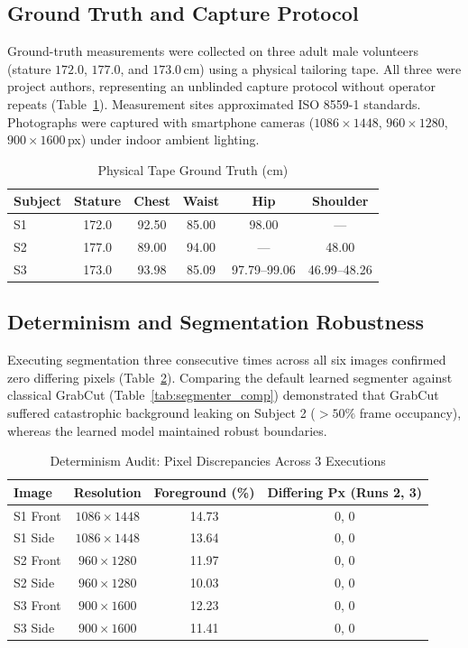 \documentclass[journal]{IEEEtran}
\begin{document}
\subsection{Ground Truth and Capture Protocol}
Ground-truth measurements were collected on three adult male volunteers (stature $172.0$, $177.0$, and $173.0$\,cm) using a physical tailoring tape. All three were project authors, representing an unblinded capture protocol without operator repeats (Table~\ref{tab:ground_truth}). Measurement sites approximated ISO 8559-1 standards. Photographs were captured with smartphone cameras ($1086 \times 1448$, $960 \times 1280$, $900 \times 1600$\,px) under indoor ambient lighting.

\begin{table}[!t]
\caption{Physical Tape Ground Truth (cm)}
\label{tab:ground_truth}
\centering
\begin{tabular}{lccccc}
\toprule
\textbf{Subject} & \textbf{Stature} & \textbf{Chest} & \textbf{Waist} & \textbf{Hip} & \textbf{Shoulder} \\
\midrule
S1 & 172.0 & 92.50 & 85.00 & 98.00 & --- \\
S2 & 177.0 & 89.00 & 94.00 & --- & 48.00 \\
S3 & 173.0 & 93.98 & 85.09 & 97.79--99.06 & 46.99--48.26 \\
\bottomrule
\end{tabular}
\end{table}

\subsection{Determinism and Segmentation Robustness}
Executing segmentation three consecutive times across all six images confirmed zero differing pixels (Table~\ref{tab:segmenter_determ}). Comparing the default learned segmenter against classical GrabCut (Table~\ref{tab:segmenter_comp}) demonstrated that GrabCut suffered catastrophic background leaking on Subject 2 ($>50\%$ frame occupancy), whereas the learned model maintained robust boundaries.

\begin{table}[!t]
\caption{Determinism Audit: Pixel Discrepancies Across 3 Executions}
\label{tab:segmenter_determ}
\centering
\begin{tabular}{lccc}
\toprule
\textbf{Image} & \textbf{Resolution} & \textbf{Foreground (\%)} & \textbf{Differing Px (Runs 2, 3)} \\
\midrule
S1 Front & $1086 \times 1448$ & 14.73 & 0, 0 \\
S1 Side & $1086 \times 1448$ & 13.64 & 0, 0 \\
S2 Front & $960 \times 1280$ & 11.97 & 0, 0 \\
S2 Side & $960 \times 1280$ & 10.03 & 0, 0 \\
S3 Front & $900 \times 1600$ & 12.23 & 0, 0 \\
S3 Side & $900 \times 1600$ & 11.41 & 0, 0 \\
\bottomrule
\end{tabular}
\end{table}
\end{document}
